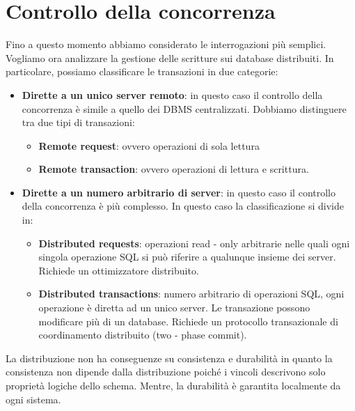\section{Controllo della concorrenza}
Fino a questo momento abbiamo considerato le interrogazioni più semplici. Vogliamo
ora analizzare la gestione delle scritture sui database distribuiti. In particolare,
possiamo classificare le transazioni in due categorie:
\begin{itemize}
      \item \textbf{Dirette a un unico server remoto}: in questo caso il controllo
            della concorrenza è simile a quello dei DBMS centralizzati. Dobbiamo
            distinguere tra due tipi di transazioni:
            \begin{itemize}
                  \item \textbf{Remote request}: ovvero operazioni di sola lettura
                  \item \textbf{Remote transaction}: ovvero operazioni di lettura e scrittura.
            \end{itemize}
      \item \textbf{Dirette a un numero arbitrario di server}: in questo caso il
            controllo della concorrenza è più complesso. In questo caso la
            classificazione si divide in:
            \begin{itemize}
                  \item \textbf{Distributed requests}: operazioni read - only
                        arbitrarie nelle quali ogni singola operazione SQL si può riferire
                        a qualunque insieme dei server. Richiede un ottimizzatore distribuito.
                  \item \textbf{Distributed transactions}: numero arbitrario di
                        operazioni SQL, ogni operazione è diretta ad un unico server.
                        Le transazione possono modificare più di un database. Richiede
                        un protocollo transazionale di coordinamento distribuito (two
                        - phase commit).
            \end{itemize}
\end{itemize}

La distribuzione non ha conseguenze su consistenza e durabilità in quanto la
consistenza non dipende dalla distribuzione poiché i vincoli descrivono solo
proprietà logiche dello schema. Mentre, la durabilità è garantita localmente da
ogni sistema.

